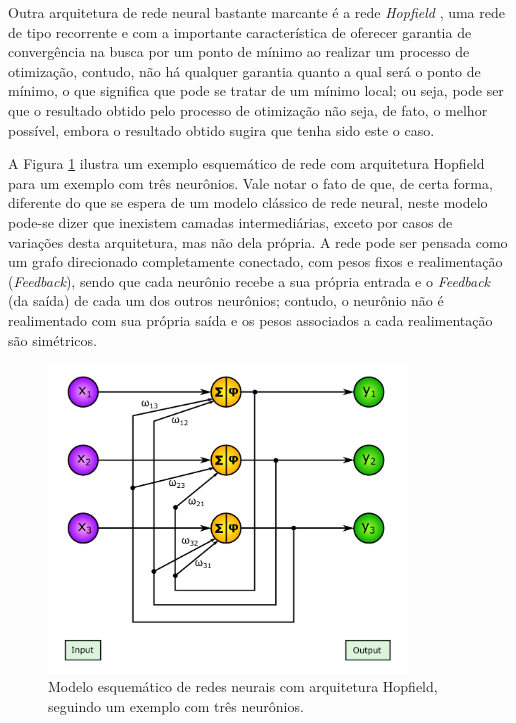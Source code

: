 Outra arquitetura de rede neural bastante marcante é a rede \textit{Hopfield} \citep{hopfield1982neural}, uma rede de tipo recorrente e com a importante característica de oferecer garantia de convergência na busca por um ponto de mínimo ao realizar um processo de otimização, contudo, não há qualquer garantia quanto a qual será o ponto de mínimo, o que significa que pode se tratar de um mínimo local; ou seja, pode ser que o resultado obtido pelo processo de otimização não seja, de fato, o melhor possível, embora o resultado obtido sugira que tenha sido este o caso.

A Figura \ref{fig:ann_arch_hopfield} ilustra um exemplo esquemático de rede com arquitetura Hopfield para um exemplo com três neurônios. Vale notar o fato de que, de certa forma, diferente do que se espera de um modelo clássico de rede neural, neste modelo pode-se dizer que inexistem camadas intermediárias, exceto por casos de variações desta arquitetura, mas não dela própria. A rede pode ser pensada como um grafo direcionado completamente conectado, com pesos fixos e realimentação (\textit{Feedback}), sendo que cada neurônio recebe a sua própria entrada e o \textit{Feedback} (da saída) de cada um dos outros neurônios; contudo, o neurônio não é realimentado com sua própria saída e os pesos associados a cada realimentação são simétricos.

\begin{figure}[H]
    \centering
    \includegraphics[width=0.85\textwidth]{figs/ann_arch_hopfield.pdf}
    \caption{Modelo esquemático de redes neurais com arquitetura Hopfield, seguindo um exemplo com três neurônios.}
    \label{fig:ann_arch_hopfield}
\end{figure}

